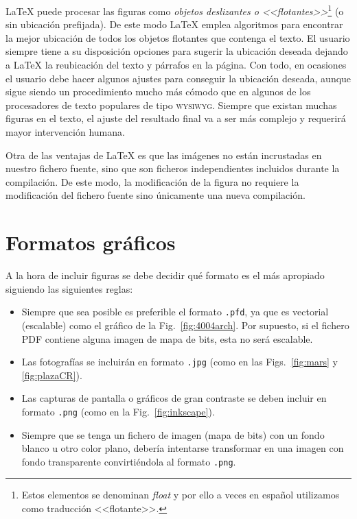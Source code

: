 \documentclass[11pt,a4paper]{article}
\begin{document}
\LaTeX{} puede procesar las figuras como \emph{objetos deslizantes o <<flotantes>>}\footnote{Estos elementos se denominan \textit{float} y por ello a veces en español utilizamos como traducción <<flotante>>.} (o sin ubicación prefijada). De este modo \LaTeX{} emplea algoritmos para encontrar la mejor ubicación de todos los objetos flotantes que contenga el texto. El usuario siempre tiene a su disposición opciones para sugerir la ubicación deseada dejando a \LaTeX{} la reubicación del texto y párrafos en la página. Con todo, en ocasiones el usuario debe hacer algunos ajustes para conseguir la ubicación deseada, aunque sigue siendo un procedimiento mucho más cómodo que en algunos de los procesadores de texto populares de tipo \textsc{wysiwyg}. Siempre que existan muchas figuras en el texto, el ajuste del resultado final va a ser más complejo y requerirá mayor intervención humana.

Otra de las ventajas de \LaTeX{} es que las imágenes no están incrustadas en nuestro fichero fuente, sino que son ficheros independientes incluidos durante la compilación. De este modo, la modificación de la figura no requiere la modificación del fichero fuente sino únicamente una nueva compilación.








\section{Formatos gráficos}
A la hora de incluir figuras se debe decidir qué formato es el más apropiado siguiendo las siguientes reglas:
\begin{itemize}
	\item Siempre que sea posible es preferible el formato \texttt{.pfd}, ya que es vectorial (escalable) como el gráfico de la Fig.~\ref{fig:4004arch}. Por supuesto, si el fichero \textsf{PDF} contiene alguna imagen de mapa de bits, esta no será escalable.
	\item Las fotografías se incluirán en formato \texttt{.jpg} (como en las  Figs.~\ref{fig:mars} y \ref{fig:plazaCR}).
	\item Las capturas de pantalla o gráficos de gran contraste se deben incluir en formato \texttt{.png} (como en la Fig.~\ref{fig:inkscape}). 
	\item Siempre que se tenga un fichero de imagen (mapa de bits) con un fondo blanco u otro color plano, debería intentarse transformar en una imagen con fondo transparente convirtiéndola al formato \texttt{.png}.
\end{itemize}
\end{document}
